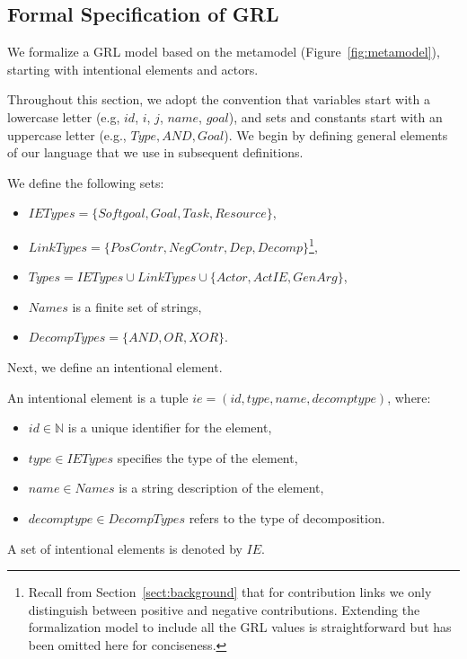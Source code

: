 \subsection{Formal Specification of GRL}
\label{sect:formalframework:grl}

We formalize a GRL model based on the metamodel (Figure~\ref{fig:metamodel}), starting with intentional elements and actors.

Throughout this section, we adopt the convention that variables start with a lowercase letter (e.g, $id$, $i$, $j$, $name$, $goal$), and sets and constants start with an uppercase letter (e.g., $Type, AND, Goal$). We begin by defining general elements of our language that we use in subsequent definitions.

\begin{definition}
\label{def:set-definitions}
We define the following sets:
\begin{itemize}
\item $IETypes = \{Softgoal, Goal, Task, Resource\}$,
\item $LinkTypes = \{PosContr, NegContr, Dep, Decomp\}$\footnote{Recall from Section~\ref{sect:background} that for contribution links we only distinguish between positive and negative contributions. Extending the formalization model to include all the GRL values is straightforward but has been omitted here for conciseness.},
\item $Types = IETypes \cup LinkTypes\cup\{Actor, ActIE, GenArg\}$,
\item $Names$ is a finite set of strings,
\item $DecompTypes = \{AND,OR,XOR\}$.
\end{itemize}
\end{definition}
Next, we define an intentional element.

\begin{definition}
\label{def:ie}
An intentional element is a tuple $ie = (id, type, name, decomptype)$, where:
\begin{itemize}
\item $id\in \mathbb{N}$ is a unique identifier for the element,
\item $type\in IETypes$ specifies the type of the element,
\item $name \in Names$ is a string description of the element,
\item $decomptype\in DecompTypes$ refers to the type of decomposition.
\end{itemize}
A set of intentional elements is denoted by $IE$.
\end{definition}

